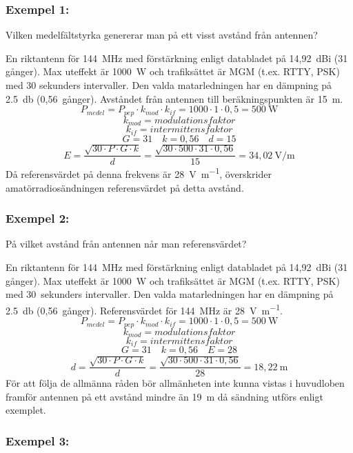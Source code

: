 \subsubsection{Exempel 1:}

Vilken medelfältstyrka genererar man på ett visst avstånd från antennen?

En riktantenn för \SI{144}{\mega\hertz} med förstärkning enligt databladet på
14,92~dBi (31 gånger).
Max uteffekt är \SI{1000}{\watt} och trafiksättet är MGM (t.ex. RTTY, PSK) med
30 sekunders intervaller.
Den valda matarledningen har en dämpning på \SI{2,5}{\decibel} (0,56~gånger).
Avståndet från antennen till beräkningspunkten är \SI{15}{\metre}.
\[P_{medel} = P_{pep} \cdot k_{mod} \cdot k_{if}
= 1000 \cdot 1 \cdot 0,5 = 500\ \mathrm{W}\]
\[k_{mod} = modulationsfaktor\]
\[k_{if} = intermittensfaktor\]
\[G = 31 \quad k = 0,56 \quad d = 15\]
\[E = \dfrac{\sqrt{30 \cdot P \cdot G \cdot k}}{d}
= \dfrac{\sqrt{30 \cdot 500 \cdot 31 \cdot 0,56}}{15}
= 34,02\ \mathrm{V/m}\]
Då referensvärdet på denna frekvens är \SI{28}{\volt\per\metre}, överskrider
amatörradiosändningen referensvärdet på detta avstånd.

\subsubsection{Exempel 2:}

På vilket avstånd från antennen når man referensvärdet?

En riktantenn för \SI{144}{\mega\hertz} med förstärkning enligt databladet på
14,92~dBi (31 gånger).
Max uteffekt är \SI{1000}{\watt} och trafiksättet är MGM (t.ex. RTTY, PSK) med
30~sekunders intervaller.
Den valda matarledningen har en dämpning på \SI{2,5}{\decibel} (0,56~gånger).
Referensvärdet för \SI{144}{\mega\hertz} är \SI{28}{\volt\per\metre}.
\[P_{medel} = P_{pep} \cdot k_{mod} \cdot k_{if}
= 1000 \cdot 1 \cdot 0,5 = 500\ \mathrm{W}\]
\[k_{mod} = \textit{modulationsfaktor}\]
\[k_{if} = \textit{intermittensfaktor}\]
\[G = 31 \quad k = 0,56 \quad E = 28\]
\[d = \dfrac{\sqrt{30 \cdot P \cdot G \cdot k}}{d}
= \dfrac{\sqrt{30 \cdot 500 \cdot 31 \cdot 0,56}}{28}
= 18,22\ \mathrm{m}\]
För att följa de allmänna råden bör allmänheten inte kunna vistas i huvudloben
framför antennen på ett avstånd mindre än \SI{19}{\metre} då sändning utförs
enligt exemplet.

\subsubsection{Exempel 3:}

